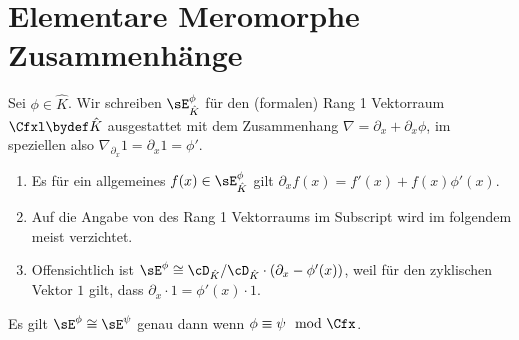 \chapter{Elementare Meromorphe Zusammenhänge}
\begin{comment}
einführen als Bausteine oder kleinste Meromorphe Zusammenhänge
\end{comment}
\begin{defn}
\cite[1.a]{sabbah_Fourier-local}
Sei $\phi\in\hat K$.
Wir schreiben $\sE_{\hat K}^\phi$ für den (formalen) Rang 1 Vektorraum $\Cfxl
\bydef \hat K$ ausgestattet mit dem Zusammenhang
$\nabla=\partial_x+\partial_x\phi$, im speziellen also
$\nabla_{\partial_x}1=\partial_x1=\phi'$.\\
\end{defn}
\begin{bem}
\begin{enumerate}
\item Es für ein allgemeines $f(x)\in\sE_{\hat K}^{\phi}$ gilt
$\partial_xf(x)=f'(x)+f(x)\phi'(x)$.
\item Auf die Angabe von des Rang 1 Vektorraums im Subscript wird im folgendem
meist verzichtet.
\item Offensichtlich ist $\sE^\phi\cong\cD_{\hat K}/\cD_{\hat
K}\cdot(\partial_x-\phi'(x))$, weil für den zyklischen Vektor $1$ gilt, dass
$\partial_x \cdot 1 = \phi'(x) \cdot 1$.
\end{enumerate}
\end{bem}

\begin{bem} \label{bem:FormRang1VR}
\cite[1.a]{sabbah_Fourier-local}
Es gilt $\sE^\phi\cong\sE^\psi$ genau dann wenn $\phi\equiv\psi \mod \Cfx$.
\end{bem}

\begin{comment}
\begin{lem}[Slope von $\sE^\phi$]
TODO
\end{lem}
\end{comment}

